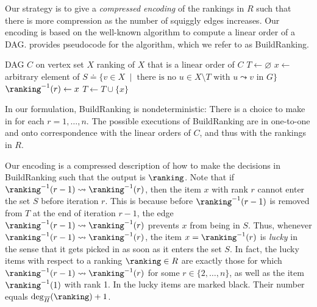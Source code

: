 \documentclass{toc}
\begin{document}
Our strategy is to give a \emph{compressed encoding} of the rankings in $R$ such that there is more compression as the number of squiggly edges increases. Our encoding is based on the well-known algorithm to compute a linear order of a DAG.  provides pseudocode for
the algorithm, which we refer to as BuildRanking.

\begin{algorithm}[ht]
  \caption{BuildRanking$(C)$}\label{alg:linear-order}
  \begin{algorithmic}[1]
    \Require DAG $C$ on vertex set $X$
    \Ensure ranking of $X$ that is a linear order of $C$
    \State $T \gets \varnothing$
      \State \label{alg:linear-order:step}%
      $x \gets$ arbitrary element of $S \doteq  \{ v \in X \;\mid\; \text{there is no } u \in X \setminus T \text{ with } u \leadsto v \text{ in } G \}$
      \State $\ranking^{-1}(r) \gets x$ 
      \State $T \gets T \cup \{x\}$
    \EndFor
  \end{algorithmic}
\end{algorithm}

In our formulation, BuildRanking is nondeterministic: There is a choice to make in  for each $r=1,\dots,n$. The possible executions of BuildRanking are in one-to-one and onto correspondence with the linear orders of $C$, and thus with the rankings in $R$. 

Our encoding is a compressed description of how to make the decisions in BuildRanking such that the output is $\ranking$. Note that if $\ranking^{-1}(r-1) \leadsto \ranking^{-1}(r)$, then the item $x$ with rank $r$ cannot enter the set $S$ before iteration $r$. This is because before $\ranking^{-1}(r-1)$ is removed from $T$ at the end of iteration $r-1$, the edge $\ranking^{-1}(r-1) \leadsto \ranking^{-1}(r)$ prevents $x$ from being in $S$. Thus, whenever $\ranking^{-1}(r-1) \leadsto \ranking^{-1}(r)$, the item $x=\ranking^{-1}(r)$ is \emph{lucky} in the sense that it gets picked in  as soon as it enters the set $S$. In fact, the lucky items with respect to a ranking $\ranking \in R$ are exactly those for which $\ranking^{-1}(r-1) \leadsto \ranking^{-1}(r)$ for some $r \in \{2,\dots,n\}$, as well as the item $\ranking^{-1}(1)$ with rank 1. In  the lucky items are marked black. Their number equals $\deg_{\overline{H}}(\ranking)+1$. 
\end{document}
